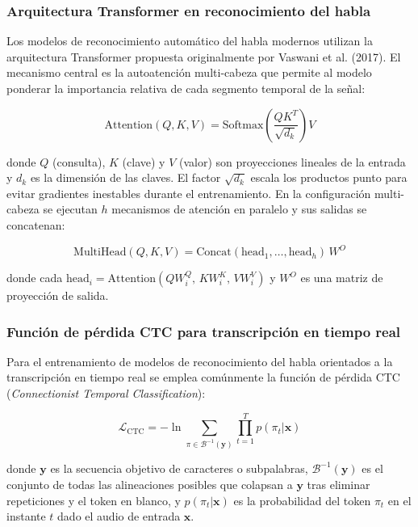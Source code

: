\documentclass[12pt,a4paper,oneside]{article}
\begin{document}
\subsubsection{Arquitectura Transformer en reconocimiento del habla}

Los modelos de reconocimiento autom\'atico del habla modernos utilizan la arquitectura Transformer propuesta originalmente por Vaswani et al. (2017). El mecanismo central es la autoatenci\'on multi-cabeza que permite al modelo ponderar la importancia relativa de cada segmento temporal de la se\~nal:

\begin{equation}
\text{Attention}(Q, K, V) = \text{Softmax}\!\left(\frac{QK^T}{\sqrt{d_k}}\right) V
\end{equation}

donde $Q$ (consulta), $K$ (clave) y $V$ (valor) son proyecciones lineales de la entrada y $d_k$ es la dimensi\'on de las claves. El factor $\sqrt{d_k}$ escala los productos punto para evitar gradientes inestables durante el entrenamiento. En la configuraci\'on multi-cabeza se ejecutan $h$ mecanismos de atenci\'on en paralelo y sus salidas se concatenan:

\begin{equation}
\text{MultiHead}(Q, K, V) = \text{Concat}(\text{head}_1, \ldots, \text{head}_h)\, W^O
\end{equation}

donde cada $\text{head}_i = \text{Attention}(QW_i^Q,\, KW_i^K,\, VW_i^V)$ y $W^O$ es una matriz de proyecci\'on de salida.

\subsubsection{Funci\'on de p\'erdida CTC para transcripci\'on en tiempo real}

Para el entrenamiento de modelos de reconocimiento del habla orientados a la transcripci\'on en tiempo real se emplea com\'unmente la funci\'on de p\'erdida CTC (\textit{Connectionist Temporal Classification}):

\begin{equation}
\mathcal{L}_{\text{CTC}} = -\ln \sum_{\pi \in \mathcal{B}^{-1}(\mathbf{y})} \prod_{t=1}^{T} p(\pi_t | \mathbf{x})
\end{equation}

donde $\mathbf{y}$ es la secuencia objetivo de caracteres o subpalabras, $\mathcal{B}^{-1}(\mathbf{y})$ es el conjunto de todas las alineaciones posibles que colapsan a $\mathbf{y}$ tras eliminar repeticiones y el token en blanco, y $p(\pi_t | \mathbf{x})$ es la probabilidad del token $\pi_t$ en el instante $t$ dado el audio de entrada $\mathbf{x}$.
\end{document}
